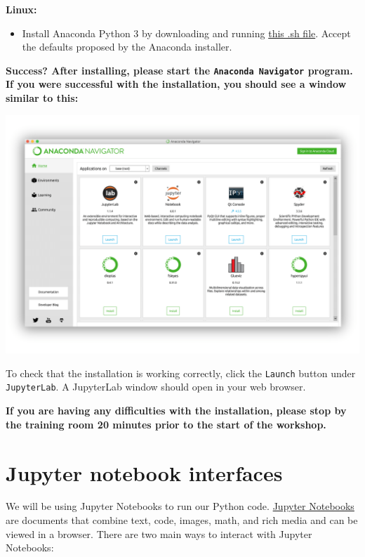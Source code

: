 \documentclass[]{book}
\providecommand{\tightlist}{%
  \setlength{\itemsep}{0pt}\setlength{\parskip}{0pt}}
\begin{document}
\textbf{Linux:}

\begin{itemize}
\tightlist
\item
  Install Anaconda Python 3 by downloading and running \href{https://repo.anaconda.com/archive/Anaconda3-2019.10-Linux-x86_64.sh}{this .sh file}. Accept the defaults proposed by the Anaconda installer.
\end{itemize}

\textbf{Success? After installing, please start the \texttt{Anaconda\ Navigator} program. If you were successful with the installation, you should see a window similar to this:}

\includegraphics{Python/PythonInstall/images/Anaconda_navigator.png}

To check that the installation is working correctly, click the \texttt{Launch} button under \texttt{JupyterLab}. A JupyterLab window should open in your web browser.

\textbf{If you are having any difficulties with the installation, please stop by the training room 20 minutes prior to the start of the workshop.}

\hypertarget{jupyter-notebook-interfaces}{%
\section{Jupyter notebook interfaces}\label{jupyter-notebook-interfaces}}

We will be using Jupyter Notebooks to run our Python code. \href{https://jupyter-notebook.readthedocs.io/en/stable/}{Jupyter Notebooks} are documents that combine text, code, images, math, and rich media and can be viewed in a browser. There are two main ways to interact with Jupyter Notebooks:
\end{document}
